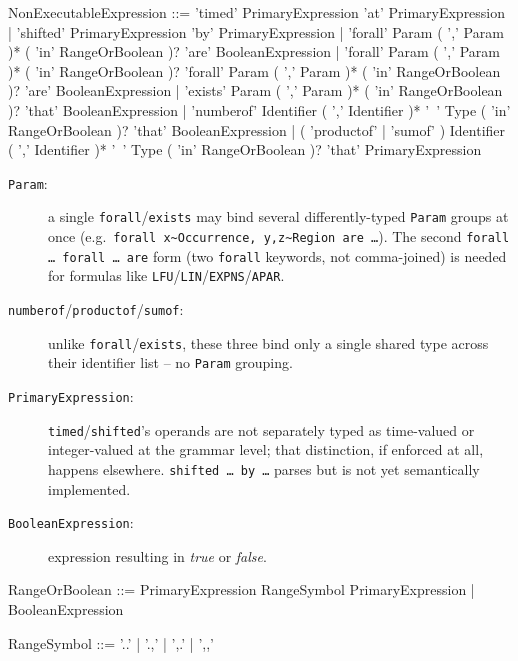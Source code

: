 \begin{bnf}
NonExecutableExpression ::=
  'timed' PrimaryExpression 'at' PrimaryExpression
| 'shifted' PrimaryExpression 'by' PrimaryExpression
| 'forall' Param ( ',' Param )* ( 'in' RangeOrBoolean )?
    'are' BooleanExpression
| 'forall' Param ( ',' Param )* ( 'in' RangeOrBoolean )?
    'forall' Param ( ',' Param )* ( 'in' RangeOrBoolean )?
    'are' BooleanExpression
| 'exists' Param ( ',' Param )* ( 'in' RangeOrBoolean )?
    'that' BooleanExpression
| 'numberof'
    Identifier ( ',' Identifier )* '~' Type ( 'in' RangeOrBoolean )?
    'that' BooleanExpression
| ( 'productof' | 'sumof' )
    Identifier ( ',' Identifier )* '~' Type ( 'in' RangeOrBoolean )?
    'that' PrimaryExpression
\end{bnf}
\begin{description}
\item[\texttt{Param}:] a single \texttt{forall}/\texttt{exists} may bind several
  differently-typed \texttt{Param} groups at once (e.g.\
  \texttt{forall x\textasciitilde{}Occurrence, y,z\textasciitilde{}Region are \ldots}).  The second
  \texttt{forall \ldots\ forall \ldots\ are} form (two \texttt{forall} keywords, not comma-joined)
  is needed for formulas like \texttt{LFU}/\texttt{LIN}/\texttt{EXPNS}/\texttt{APAR}.
\item[\texttt{numberof}/\texttt{productof}/\texttt{sumof}:] unlike \texttt{forall}/\texttt{exists},
  these three bind only a single shared type across their identifier list -- no \texttt{Param}
  grouping.
\item[\texttt{PrimaryExpression}:] \texttt{timed}/\texttt{shifted}'s operands are not separately
  typed as time-valued or integer-valued at the grammar level; that distinction, if enforced at
  all, happens elsewhere.  \texttt{shifted \ldots\ by \ldots} parses but is not yet semantically
  implemented.
\item[\texttt{BooleanExpression}:] expression resulting in \emph{true} or  \emph{false}.
\end{description}

\begin{bnf}
RangeOrBoolean ::=
  PrimaryExpression RangeSymbol PrimaryExpression
  | BooleanExpression
\end{bnf}

\begin{bnf}
RangeSymbol ::= '..' | '.,' | ',.' | ',,'
\end{bnf}



